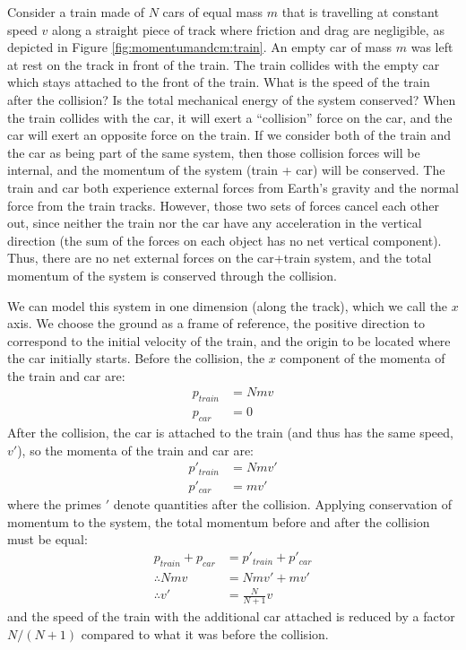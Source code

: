 \begin{example}{
Consider a train made of $N$ cars of equal mass $m$ that is travelling at constant speed $v$ along a straight piece of track where friction and drag are negligible, as depicted in Figure \ref{fig:momentumandcm:train}. An empty car of mass $m$ was left at rest on the track in front of the train. The train collides with the empty car which stays attached to the front of the train. What is the speed of the train after the collision? Is the total mechanical energy of the system conserved?}
When the train collides with the car, it will exert a ``collision'' force on the car, and the car will exert an opposite force on the train. If we consider both of the train and the car as being part of the same system, then those collision forces will be internal, and the momentum of the system (train + car) will be conserved. The train and car both experience external forces from Earth's gravity and the normal force from the train tracks. However, those two sets of forces cancel each other out, since neither the train nor the car have any acceleration in the vertical direction (the sum of the forces on each object has no net vertical component). Thus, there are no net external forces on the car+train system, and the total momentum of the system is conserved through the collision.

We can model this system in one dimension (along the track), which we call the $x$ axis. We choose the ground as a frame of reference, the positive direction to correspond to the initial velocity of the train, and the origin to be located where the car initially starts. Before the collision, the $x$ component of the momenta of the train and car are:
\begin{align*}
p_{train}&=Nmv\\
p_{car}&=0
\end{align*}
After the collision, the car is attached to the train (and thus has the same speed, $v'$), so the momenta of the train and car are:
\begin{align*}
p'_{train}&=Nmv'\\
p'_{car}&=mv'
\end{align*}
where the primes $'$ denote quantities after the collision. Applying conservation of momentum to the system, the total momentum before and after the collision must be equal:
\begin{align*}
p_{train}+p_{car}&=p'_{train}+p'_{car}\\
\therefore Nmv &= Nmv' +mv'\\
\therefore v' &=\frac{N}{N+1}v
\end{align*}
and the speed of the train with the additional car attached is reduced by a factor $N/(N+1)$ compared to what it was before the collision.


\end{example}
